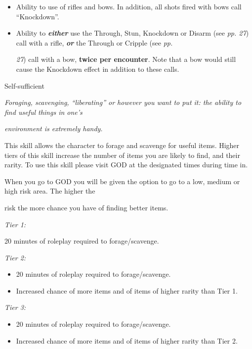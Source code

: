 \begin{itemize}
\item Ability to use of rifles and bows. In addition, all shots fired with bows call ``Knockdown''.

\item Ability to \textbf{\textit{either}} use the Through, Stun, Knockdown or Disarm (see \textit{pp. 27}) call with a rifle, \textbf{\textit{or}} the Through or Cripple (see \textit{pp.}

\textit{27}) call with a bow, \textbf{twice per encounter}. Note that a bow would still cause the Knockdown effect in addition to these calls.

\end{itemize}
Self-sufficient

\textit{Foraging, scavenging, ``liberating'' or however you want to put it: the ability to find useful things in one's}

\textit{environment is extremely handy.}

This skill allows the character to forage and scavenge for useful items. Higher tiers of this skill increase the number of items you are likely to find, and their rarity. To use this skill please visit GOD at the designated times during time in.

When you go to GOD you will be given the option to go to a low, medium or high risk area. The higher the

risk the more chance you have of finding better items.

\textit{Tier 1:}

20 minutes of roleplay required to forage/scavenge.

\textit{Tier 2:}

\begin{itemize}
\item 20 minutes of roleplay required to forage/scavenge.

\item Increased chance of more items and of items of higher rarity than Tier 1.

\end{itemize}
\textit{Tier 3:}

\begin{itemize}
\item 20 minutes of roleplay required to forage/scavenge.

\item Increased chance of more items and of items of higher rarity than Tier 2.

\end{itemize}
